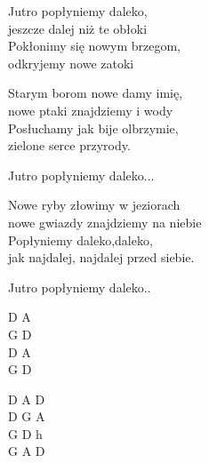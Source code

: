 \begin{text}
    \vin Jutro popłyniemy daleko,\\
    \vin jeszcze dalej niż te obłoki\\
    \vin Pokłonimy się nowym brzegom,\\
    \vin odkryjemy nowe zatoki

    Starym borom nowe damy imię,\\
    nowe ptaki znajdziemy i wody\\
    Posłuchamy jak bije olbrzymie,\\
    zielone serce przyrody.

    \vin Jutro popłyniemy daleko...

    Nowe ryby złowimy w jeziorach\\
    nowe gwiazdy znajdziemy na niebie\\
    Popłyniemy daleko,daleko,\\
    jak najdalej, najdalej przed siebie.

    \vin Jutro popłyniemy daleko..
\end{text}
\begin{chord}
    D A\\
    G D\\
    D A\\
    G D

    D A D\\
    D G A\\
    G D h\\
    G A D
\end{chord}
